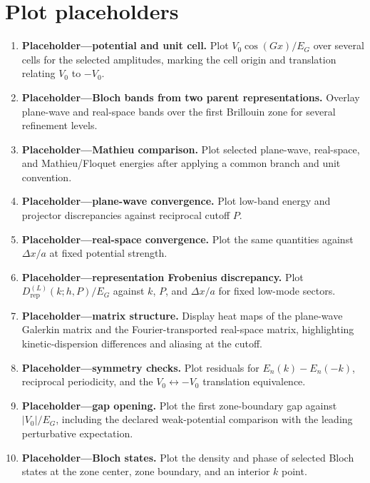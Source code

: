\section*{Plot placeholders}

\begin{enumerate}
    \item \textbf{Placeholder---potential and unit cell.} Plot
          $V_0\cos(Gx)/E_G$ over several cells for the selected amplitudes,
          marking the cell origin and translation relating $V_0$ to $-V_0$.
    \item \textbf{Placeholder---Bloch bands from two parent representations.}
          Overlay plane-wave and real-space bands over the first Brillouin zone
          for several refinement levels.
    \item \textbf{Placeholder---Mathieu comparison.} Plot selected
          plane-wave, real-space, and Mathieu/Floquet energies after applying a
          common branch and unit convention.
    \item \textbf{Placeholder---plane-wave convergence.} Plot low-band energy
          and projector discrepancies against reciprocal cutoff $P$.
    \item \textbf{Placeholder---real-space convergence.} Plot the same
          quantities against $\Delta x/a$ at fixed potential strength.
    \item \textbf{Placeholder---representation Frobenius discrepancy.} Plot
          $D_{\mathrm{rep}}^{(L)}(k;h,P)/E_G$ against $k$, $P$, and
          $\Delta x/a$ for fixed low-mode sectors.
    \item \textbf{Placeholder---matrix structure.} Display heat maps of the
          plane-wave Galerkin matrix and the Fourier-transported real-space
          matrix, highlighting kinetic-dispersion differences and aliasing at
          the cutoff.
    \item \textbf{Placeholder---symmetry checks.} Plot residuals for
          $E_n(k)-E_n(-k)$, reciprocal periodicity, and the
          $V_0\leftrightarrow -V_0$ translation equivalence.
    \item \textbf{Placeholder---gap opening.} Plot the first zone-boundary gap
          against $|V_0|/E_G$, including the declared weak-potential comparison
          with the leading perturbative expectation.
    \item \textbf{Placeholder---Bloch states.} Plot the density and phase of
          selected Bloch states at the zone center, zone boundary, and an
          interior $k$ point.

\end{enumerate}
